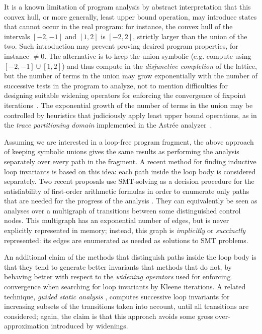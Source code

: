 \documentclass[preprint]{sigplanconf}
\begin{document}
It is a known limitation of program analysis by abstract interpretation that this convex hull, or more generally, least upper bound operation, may introduce states that cannot occur in the real program: for instance, the convex hull of the intervals $[-2,-1]$ and $[1,2]$ is $[-2,2]$, strictly larger than the union of the two.
Such introduction may prevent proving desired program properties, for instance $\neq 0$. The alternative is to keep the union symbolic (e.g. compute using $[-2,-1] \cup [1,2]$) and thus compute in the \emph{disjunctive completion}
of the lattice, but the number of terms in the union may grow exponentially with the number of successive tests in the program to analyze, not to mention difficulties for designing suitable widening operators for enforcing the convergence of fixpoint iterations~\cite{PPL,BagnaraHZ08SCP,DBLP:journals/sttt/BagnaraHZ07}.
The exponential growth of the number of terms in the union may be controlled by heuristics that judiciously apply least upper bound operations, as in the \emph{trace partitioning domain} \cite{Rival_Mauborgne_TOPLAS07} implemented in the Astr\'ee analyzer~\cite{ASTREE_PLDI03,ASTREE_ESOP05}.

Assuming we are  interested in a loop-free program fragment, the above approach of keeping symbolic unions gives the same results as performing the analysis separately over every path in the fragment.
A recent method for finding inductive loop invariants \cite{DBLP:conf/pldi/GulwaniZ10} is based on this idea: each path inside the loop body is considered separately.
Two recent proposals use SMT-solving \cite{Kroening_Strichman_08} as a decision procedure for the satisfiability of first-order arithmetic formulas in order to enumerate only paths that are needed for the progress of the analysis \cite{Gawlitza_Monniaux_ESOP11,Monniaux_Gonnord_SAS11}. They can equivalently be seen as analyses over a multigraph of transitions between some distinguished control nodes. This multigraph has an exponential number of edges, but is never explicitly represented in memory; instead, this graph is \emph{implicitly} or \emph{succinctly} represented: its edges are enumerated as needed as solutions to SMT problems.

An additional claim of the methods that distinguish paths inside the loop body \cite{DBLP:conf/pldi/GulwaniZ10,Monniaux_Gonnord_SAS11} is that they tend to generate better invariants that methods that do not, by behaving better with respect to the \emph{widening operators} \cite{CousotCousot_JLC92}
used for enforcing convergence when searching for loop invariants by Kleene iterations. A related technique, \emph{guided static analysis} \cite{DBLP:conf/sas/GopanR07}, computes successive loop invariants for increasing subsets of the transitions taken into account, until all transitions are considered; again, the claim is that this approach avoids some gross over-approximation introduced by widenings.
\end{document}
